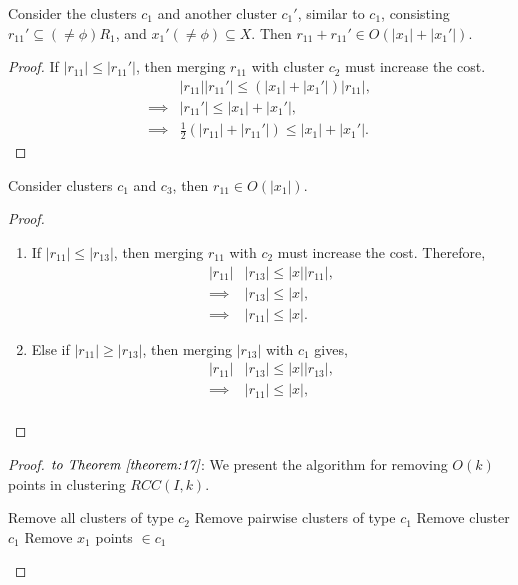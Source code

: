 \begin{lemma}\label{lemma-d2}
Consider the clusters $c_1$ and another cluster $c_{1}'$, similar to $c_1$, consisting $r_{11}'\subseteq (\neq \phi)R_1$, and $x_{1}' (\neq \phi) \subseteq X$.
Then $r_{11}+r_{11}'\in O(|x_1|+|x_1'|)$.
\end{lemma}
\begin{proof}
If $|r_{11}|\leq|r_{11}'|$, then merging $r_{11}$ with cluster $c_{2}$ must increase the cost.
    \begin{align*}
        &|r_{11}| |r_{11}'| \le (|x_1| + |x_{1}'|) |r_{11}|,\\
        \implies &|r_{11}'| \le |x_1| + |x_{1}'|,\\
        \implies &\frac12 (|r_{11}|+|r_{11}'|) \le |x_1| + |x_{1}'|.
    \end{align*}
\end{proof}
\begin{lemma}\label{lemma-d3}
Consider clusters $c_1$ and $c_3$, then $r_{11}\in O(|x_1|)$.
\end{lemma}
\begin{proof}
\begin{enumerate}
    \item If $|r_{11}| \le |r_{13}|$, then merging $r_{11}$ with $c_2$ must increase the cost. Therefore,
    \begin{align*}
        |r_{11}| &|r_{13}| \le |x| |r_{11}|,\\
        \implies &|r_{13}| \le |x|,\\
        \implies &|r_{11}| \le |x|.
    \end{align*}
    \item Else if $|r_{11}| \ge |r_{13}|$, then merging $|r_{13}|$ with $c_1$ gives,
    \begin{align*}
        |r_{11}| &|r_{13}| \le |x| |r_{13}|,\\
        \implies &|r_{11}| \le |x|,\\
    \end{align*}
\end{enumerate}
\end{proof}

\begin{proof}$\textit{to Theorem \ref{theorem:17}}$: 
We present the algorithm for removing $O(k)$ points in clustering $RCC(I,k)$.

\begin{algorithm}[H]\label{algo-d1}
\caption{}
\label{alg:dynamicf}
\begin{algorithmic}[1]
\State Remove all clusters of type $c_2$
\State Remove pairwise clusters of type $c_1$
\State Remove cluster $c_1$
\State Remove $x_1$ points $\in c_1$
\EndIf
\end{algorithmic}
\end{algorithm}


\end{proof}

